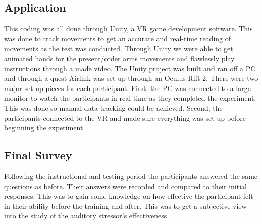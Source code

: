 \documentclass[manuscript,screen,review]{acmart}
\begin{document}
\subsection{Application}
This coding was all done through Unity, a VR game development software. This was done to track movements 
to get an accurate and real-time reading of movements as the test was conducted. Through Unity we were 
able to get animated hands for the present/order arms movements and flawlessly play instructions through 
a made video. The Unity project was built and ran off a PC and through a quest Airlink was set up through 
an Oculus Rift 2. There were two major set up pieces for each participant. First, the PC was connected to 
a large monitor to watch the participants in real time as they completed the experiment. This was done so 
manual data tracking could be achieved. Second, the participants connected to the VR and made sure everything 
was set up before beginning the experiment.  

\subsection{Final Survey}
Following the instructional and testing period the participants answered the same questions as before. 
Their answers were recorded and compared to their initial responses. This was to gain some knowledge on 
how effective the participant felt in their ability before the training and after. This was to get a 
subjective view into the study of the auditory stressor's effectiveness

\end{document}
